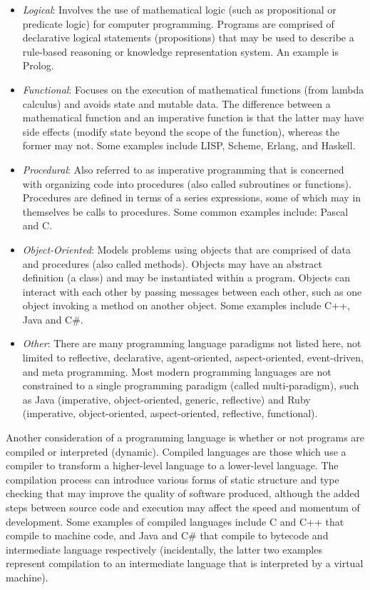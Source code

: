 \documentclass[a4paper, 11pt]{article}
\begin{document}
\begin{itemize}
	\item \emph{Logical}: Involves the use of mathematical logic (such as propositional or predicate logic) for computer programming. Programs are comprised of declarative logical statements (propositions) that may be used to describe a rule-based reasoning or knowledge representation system. An example is Prolog. 
	\item \emph{Functional}: Focuses on the execution of mathematical functions (from lambda calculus) and avoids state and mutable data. The difference between a mathematical function and an imperative function is that the latter may have side effects (modify state beyond the scope of the function), whereas the former may not. Some examples include LISP, Scheme, Erlang, and Haskell.	
	\item \emph{Procedural}: Also referred to as imperative programming that is concerned with organizing code into procedures (also called subroutines or functions). Procedures are defined in terms of a series expressions, some of which may in themselves be calls to procedures. Some common examples include: Pascal and C.
	\item \emph{Object-Oriented}: Models problems using objects that are comprised of data and procedures (also called methods). Objects may have an abstract definition (a class) and may be instantiated within a program. Objects can interact with each other by passing messages between each other, such as one object invoking a method on another object. Some examples include C++, Java and C\#.
	\item \emph{Other}: There are many programming language paradigms not listed here, not limited to reflective, declarative, agent-oriented, aspect-oriented, event-driven, and meta programming. Most modern programming languages are not constrained to a single programming paradigm (called multi-paradigm), such as Java (imperative, object-oriented, generic, reflective) and Ruby (imperative, object-oriented, aspect-oriented, reflective, functional).
\end{itemize}

Another consideration of a programming language is whether or not programs are compiled or interpreted (dynamic). 
Compiled languages are those which use a compiler to transform a higher-level language to a lower-level language. The compilation process can introduce various forms of static structure and type checking that may improve the quality of software produced, although the added steps between source code and execution may affect the speed and momentum of development. Some examples of compiled languages include C and C++ that compile to machine code, and Java and C\# that compile to bytecode and intermediate language respectively (incidentally, the latter two examples represent compilation to an intermediate language that is interpreted by a virtual machine).
\end{document}
